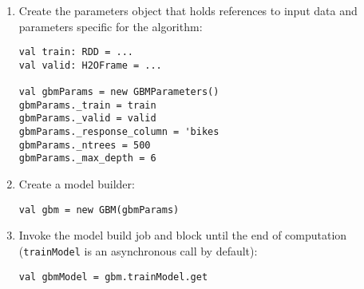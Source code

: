 \begin{enumerate}
\item Create the parameters object that holds references to input data and parameters specific for the algorithm:

\begin{lstlisting}[style=Scala]
val train: RDD = ...
val valid: H2OFrame = ...

val gbmParams = new GBMParameters()
gbmParams._train = train
gbmParams._valid = valid
gbmParams._response_column = 'bikes
gbmParams._ntrees = 500
gbmParams._max_depth = 6
\end{lstlisting}

 \item Create a model builder:
 \begin{lstlisting}[style=Scala]
 val gbm = new GBM(gbmParams)
 \end{lstlisting}
 
 \item Invoke the model build job and block until the end of computation (\texttt{trainModel} is an asynchronous call by default): 
 \begin{lstlisting}[style=Scala]
 val gbmModel = gbm.trainModel.get 
 \end{lstlisting}
 \end{enumerate}
